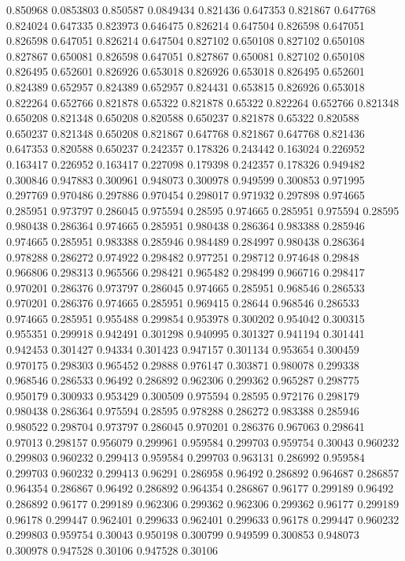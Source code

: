 0.850968 0.0853803
0.850587 0.0849434
0.821436 0.647353
0.821867 0.647768
0.824024 0.647335
0.823973 0.646475
0.826214 0.647504
0.826598 0.647051
0.826598 0.647051
0.826214 0.647504
0.827102 0.650108
0.827102 0.650108
0.827867 0.650081
0.826598 0.647051
0.827867 0.650081
0.827102 0.650108
0.826495 0.652601
0.826926 0.653018
0.826926 0.653018
0.826495 0.652601
0.824389 0.652957
0.824389 0.652957
0.824431 0.653815
0.826926 0.653018
0.822264 0.652766
0.821878 0.65322
0.821878 0.65322
0.822264 0.652766
0.821348 0.650208
0.821348 0.650208
0.820588 0.650237
0.821878 0.65322
0.820588 0.650237
0.821348 0.650208
0.821867 0.647768
0.821867 0.647768
0.821436 0.647353
0.820588 0.650237
0.242357 0.178326
0.243442 0.163024
0.226952 0.163417
0.226952 0.163417
0.227098 0.179398
0.242357 0.178326
0.949482 0.300846
0.947883 0.300961
0.948073 0.300978
0.949599 0.300853
0.971995 0.297769
0.970486 0.297886
0.970454 0.298017
0.971932 0.297898
0.974665 0.285951
0.973797 0.286045
0.975594 0.28595
0.974665 0.285951
0.975594 0.28595
0.980438 0.286364
0.974665 0.285951
0.980438 0.286364
0.983388 0.285946
0.974665 0.285951
0.983388 0.285946
0.984489 0.284997
0.980438 0.286364
0.978288 0.286272
0.974922 0.298482
0.977251 0.298712
0.974648 0.29848
0.966806 0.298313
0.965566 0.298421
0.965482 0.298499
0.966716 0.298417
0.970201 0.286376
0.973797 0.286045
0.974665 0.285951
0.968546 0.286533
0.970201 0.286376
0.974665 0.285951
0.969415 0.28644
0.968546 0.286533
0.974665 0.285951
0.955488 0.299854
0.953978 0.300202
0.954042 0.300315
0.955351 0.299918
0.942491 0.301298
0.940995 0.301327
0.941194 0.301441
0.942453 0.301427
0.94334 0.301423
0.947157 0.301134
0.953654 0.300459
0.970175 0.298303
0.965452 0.29888
0.976147 0.303871
0.980078 0.299338
0.968546 0.286533
0.96492 0.286892
0.962306 0.299362
0.965287 0.298775
0.950179 0.300933
0.953429 0.300509
0.975594 0.28595
0.972176 0.298179
0.980438 0.286364
0.975594 0.28595
0.978288 0.286272
0.983388 0.285946
0.980522 0.298704
0.973797 0.286045
0.970201 0.286376
0.967063 0.298641
0.97013 0.298157
0.956079 0.299961
0.959584 0.299703
0.959754 0.30043
0.960232 0.299803
0.960232 0.299413
0.959584 0.299703
0.963131 0.286992
0.959584 0.299703
0.960232 0.299413
0.96291 0.286958
0.96492 0.286892
0.964687 0.286857
0.964354 0.286867
0.96492 0.286892
0.964354 0.286867
0.96177 0.299189
0.96492 0.286892
0.96177 0.299189
0.962306 0.299362
0.962306 0.299362
0.96177 0.299189
0.96178 0.299447
0.962401 0.299633
0.962401 0.299633
0.96178 0.299447
0.960232 0.299803
0.959754 0.30043
0.950198 0.300799
0.949599 0.300853
0.948073 0.300978
0.947528 0.30106
0.947528 0.30106
